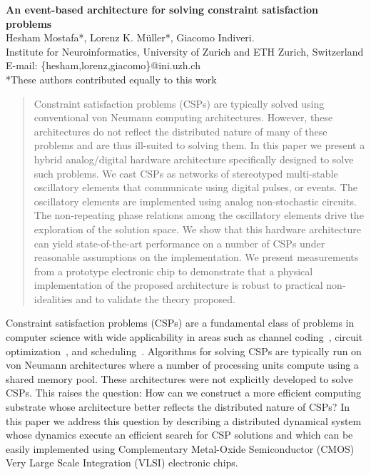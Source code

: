 \documentclass[10pt]{article}
\date{}
\begin{document}
\begin{flushleft}
{\Large
\textbf{An event-based architecture for solving constraint satisfaction problems}
}
\\
Hesham Mostafa*, 
Lorenz K. M\"uller*, 
Giacomo Indiveri.
\\
Institute for Neuroinformatics, University of Zurich and ETH Zurich, Switzerland \\
E-mail: \{hesham,lorenz,giacomo\}@ini.uzh.ch\\ 
*These authors contributed equally to this work
\end{flushleft}
\begin{abstract}









Constraint satisfaction problems (CSPs) are typically solved using conventional von Neumann computing architectures. However, these architectures do not reflect the distributed nature of many of these problems and are thus ill-suited to solving them. In this paper we present a hybrid analog/digital hardware architecture specifically designed to solve such problems. We cast CSPs as networks of stereotyped multi-stable oscillatory elements that communicate using digital pulses, or events. The oscillatory elements are implemented using analog non-stochastic circuits. The non-repeating phase relations among the oscillatory elements drive the exploration of the solution space. We show that this hardware architecture can yield state-of-the-art performance on a number of CSPs under reasonable assumptions on the implementation. We present measurements from a prototype electronic chip to demonstrate that a physical implementation of the proposed architecture is robust to practical non-idealities and to validate the theory proposed. 
\end{abstract}



Constraint satisfaction problems (CSPs) are a fundamental class of problems in computer science with wide applicability in areas such as channel coding~\cite{MacKay03}, circuit optimization~\cite{kirkpatrick_etal83}, and scheduling~\cite{garey_etal76}. Algorithms for solving CSPs are typically run on von Neumann architectures where a number of processing units compute using a shared memory pool. These architectures were not explicitly developed to solve CSPs. This raises the question: How can we construct a more efficient computing substrate whose architecture better reflects the distributed nature of CSPs? In this paper we address this question by describing a distributed dynamical system whose dynamics execute an efficient search for CSP solutions and which can be easily implemented using Complementary Metal-Oxide Semiconductor (CMOS) Very Large Scale Integration (VLSI) electronic chips.
\end{document}
